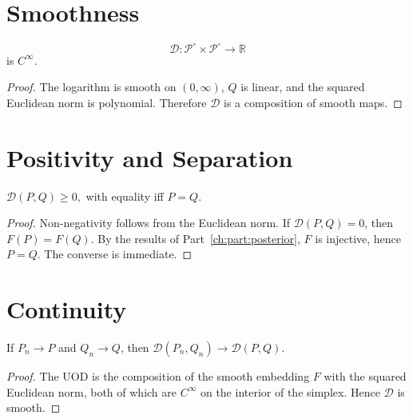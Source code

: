 \section{Smoothness}\label{ch:sec:smoothness}
\begin{theorem}[Smoothness]
\label{ch:thm:23-1}
\[
\mathcal D:\mathcal P^\circ\times\mathcal P^\circ\rightarrow\mathbb R
\]
is \(C^\infty\).
\end{theorem}
\begin{proof} The logarithm is smooth on \((0,\infty)\), \(Q\) is
linear, and the squared Euclidean norm is polynomial. Therefore
\(\mathcal D\) is a composition of smooth maps. 
\end{proof}
\section{Positivity and Separation}\label{ch:sec:positivity-and-separation}
\begin{theorem}[Positivity]
\label{ch:thm:23-2}
$\mathcal D(P,Q)\ge0,$
with equality iff \(P=Q\).
\end{theorem}
\begin{proof} Non-negativity follows from the Euclidean norm. If
\(\mathcal D(P,Q)=0\), then \(F(P)=F(Q)\). By the results of Part~\ref{ch:part:posterior}, \(F\) is
injective, hence \(P=Q\). The converse is immediate. 
\end{proof}
\section{Continuity}\label{ch:sec:continuity}
\begin{theorem}[Continuity]
\label{ch:thm:23-3}
If \(P_n\to P\) and \(Q_n\to Q\), then
$\mathcal D(P_n,Q_n)\to\mathcal D(P,Q).$
\end{theorem}
\begin{proof} The UOD is the composition of the smooth embedding
\(F\) with the squared Euclidean norm, both of which are \(C^\infty\)
on the interior of the simplex.  Hence \(\mathcal D\) is smooth.
\end{proof}
